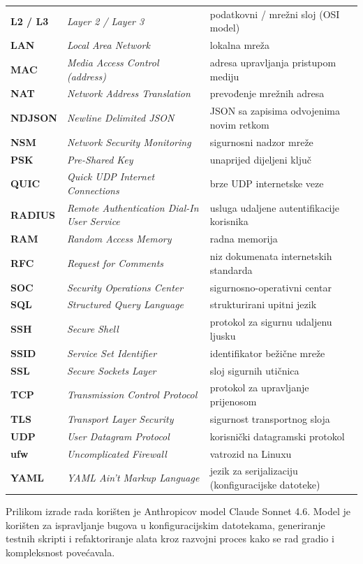 \documentclass[diplomskirad]{fer}
\begin{document}
\begin{xltabular}{\textwidth}{>{\bfseries}p{0.12\textwidth} >{\itshape}p{0.42\textwidth} X}
  L2 / L3 & Layer 2 / Layer 3 & podatkovni / mrežni sloj (OSI model) \\
  LAN & Local Area Network & lokalna mreža \\
  MAC & Media Access Control (address) & adresa upravljanja pristupom mediju \\
  NAT & Network Address Translation & prevođenje mrežnih adresa \\
  NDJSON & Newline Delimited JSON & JSON sa zapisima odvojenima novim retkom \\
  NSM & Network Security Monitoring & sigurnosni nadzor mreže \\
  PSK & Pre-Shared Key & unaprijed dijeljeni ključ \\
  QUIC & Quick UDP Internet Connections & brze UDP internetske veze \\
  RADIUS & Remote Authentication Dial-In User Service & usluga udaljene autentifikacije korisnika \\
  RAM & Random Access Memory & radna memorija \\
  RFC & Request for Comments & niz dokumenata internetskih standarda \\
  SOC & Security Operations Center & sigurnosno-operativni centar \\
  SQL & Structured Query Language & strukturirani upitni jezik \\
  SSH & Secure Shell & protokol za sigurnu udaljenu ljusku \\
  SSID & Service Set Identifier & identifikator bežične mreže \\
  SSL & Secure Sockets Layer & sloj sigurnih utičnica \\
  TCP & Transmission Control Protocol & protokol za upravljanje prijenosom \\
  TLS & Transport Layer Security & sigurnost transportnog sloja \\
  UDP & User Datagram Protocol & korisnički datagramski protokol \\
  ufw & Uncomplicated Firewall & vatrozid na Linuxu \\
  YAML & YAML Ain't Markup Language & jezik za serijalizaciju (konfiguracijske datoteke) \\
\end{xltabular}

\izjavaoUI{}
Prilikom izrade rada korišten je Anthropicov model Claude Sonnet 4.6. Model je korišten za ispravljanje bugova u konfiguracijskim datotekama, generiranje testnih
skripti i refaktoriranje alata kroz razvojni proces kako se rad gradio i kompleksnost povećavala.
\end{document}
